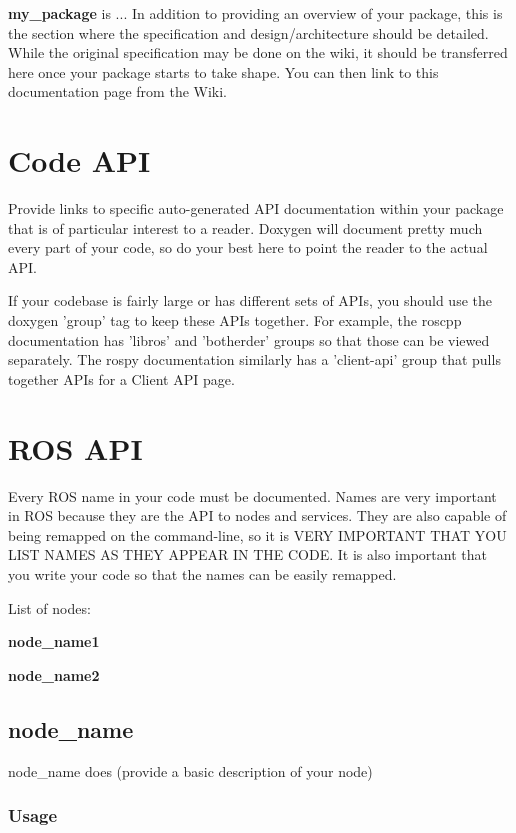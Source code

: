 

{\bfseries my\-\_\-package} is ... In addition to providing an overview of your package, this is the section where the specification and design/architecture should be detailed. While the original specification may be done on the wiki, it should be transferred here once your package starts to take shape. You can then link to this documentation page from the Wiki.\section{Code A\-P\-I}\label{index_codeapi}
Provide links to specific auto-\/generated A\-P\-I documentation within your package that is of particular interest to a reader. Doxygen will document pretty much every part of your code, so do your best here to point the reader to the actual A\-P\-I.

If your codebase is fairly large or has different sets of A\-P\-Is, you should use the doxygen 'group' tag to keep these A\-P\-Is together. For example, the roscpp documentation has 'libros' and 'botherder' groups so that those can be viewed separately. The rospy documentation similarly has a 'client-\/api' group that pulls together A\-P\-Is for a Client A\-P\-I page.\section{R\-O\-S A\-P\-I}\label{index_rosapi}
Every R\-O\-S name in your code must be documented. Names are very important in R\-O\-S because they are the A\-P\-I to nodes and services. They are also capable of being remapped on the command-\/line, so it is V\-E\-R\-Y I\-M\-P\-O\-R\-T\-A\-N\-T T\-H\-A\-T Y\-O\-U L\-I\-S\-T N\-A\-M\-E\-S A\-S T\-H\-E\-Y A\-P\-P\-E\-A\-R I\-N T\-H\-E C\-O\-D\-E. It is also important that you write your code so that the names can be easily remapped.

List of nodes\-:
\begin{DoxyItemize}
\item {\bfseries node\-\_\-name1} 
\item {\bfseries node\-\_\-name2} 
\end{DoxyItemize}



\subsection{node\-\_\-name}\label{index_node_name}
node\-\_\-name does (provide a basic description of your node)\subsubsection{Usage}\label{index_Usage}


